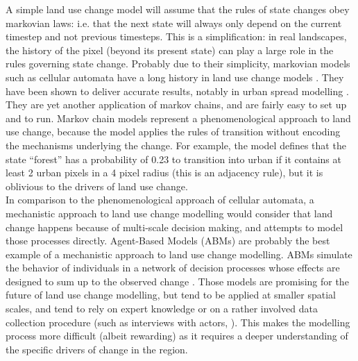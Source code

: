 \documentclass[12pt,Bold,TexShade]{thesis/mcgilletdclass}
\begin{document}
{A simple land use change model will assume that the rules of state changes obey markovian laws: i.e. that the next state will always only depend on the current timestep and not previous timesteps. This is a simplification: in real landscapes, the history of the pixel (beyond its present state) can play a large role in the rules governing state change. Probably due to their simplicity, markovian models such as cellular automata have a long history in land use change models \citep{agarwal_review_2002}. They have been shown to deliver accurate results, notably in urban spread modelling \citep{soares-filho_dinamicastochastic_2002, jokar_arsanjani_integration_2013, iacono_markov_2015}. They are yet another application of markov chains, and are fairly easy to set up and to run. Markov chain models represent a phenomenological approach to land use change, because the model applies the rules of transition without encoding the mechanisms underlying the  change. For example, the model defines that the state “forest” has a probability of 0.23 to transition into urban if it contains at least 2 urban pixels in a 4 pixel radius (this is an adjacency rule), but it is oblivious to the drivers of land use change. \\

In comparison to the phenomenological approach of cellular automata, a mechanistic approach to land use change modelling would consider that land change happens because of multi-scale decision making, and attempts to model those processes directly. Agent-Based Models (ABMs) are probably the best example of a mechanistic approach to land use change modelling. ABMs simulate the behavior of individuals in a network of decision processes whose effects are designed to sum up to the observed change \citep{parker_agent-based_2002, filatova_spatial_2013}. Those models are promising for the future of land use change modelling, but tend to be applied at smaller spatial scales, and tend to rely on expert knowledge or on a rather involved data collection procedure (such as interviews with actors, \cite{taylor_agent-based_2016}). This makes the modelling process more difficult (albeit rewarding) as it requires a deeper understanding of the specific drivers of change in the region. \\

}
\end{document}
